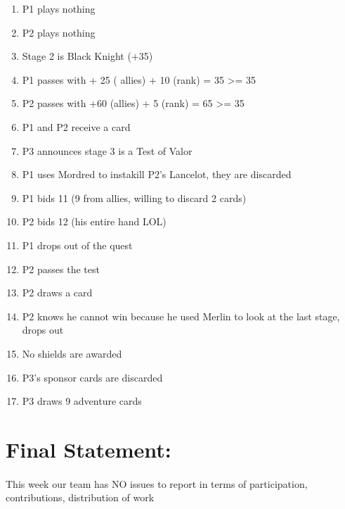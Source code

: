 \documentclass[a4paper,11pt]{article}
\begin{document}
\begin{enumerate}
\item P1 plays nothing
\item P2 plays nothing
\item Stage 2 is Black Knight (+35)
\item P1 passes with + 25 ( allies) + 10 (rank) = 35 >= 35
\item P2 passes with +60 (allies) + 5 (rank) = 65 >= 35
\item P1 and P2 receive a card
\item P3 announces stage 3 is a Test of Valor
\item P1 uses Mordred to instakill P2’s Lancelot, they are discarded
\item P1 bids 11 (9 from allies, willing to discard 2 cards)
\item P2 bids 12 (his entire hand LOL)
\item P1 drops out of the quest
\item P2 passes the test
\item P2 draws a card
\item P2 knows he cannot win because he used Merlin to look at the last stage, drops out
\item No shields are awarded
\item P3’s sponsor cards are discarded
\item P3 draws 9 adventure cards
\end{enumerate}


\section{Final Statement:}
\paragraph{}
This week our team has NO issues to report in terms of participation, contributions, distribution of work
\paragraph{}
\end{document}
